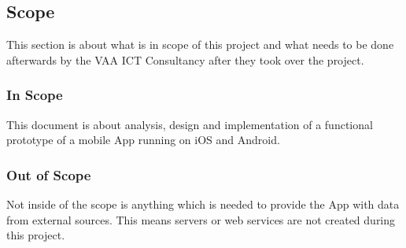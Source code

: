 \subsection{Scope}
This section is about what is in scope of this project and what needs to be done afterwards by the VAA ICT Consultancy after they took over the project.
\subsubsection{In Scope}
This document is about analysis, design and implementation of a functional prototype of a mobile App running on iOS and Android. 
\subsubsection{Out of Scope}
Not inside of the scope is anything which is needed to provide the App with data from external sources. This means servers or web services are not created during this project. 